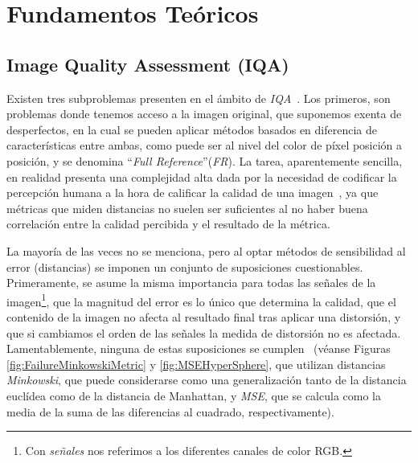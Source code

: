 \chapter{Fundamentos Teóricos}
\section{Image Quality Assessment (IQA)}
\label{sec:IQA}
Existen tres subproblemas presenten en el ámbito de \emph{IQA}~\cite{RecentIQASurvey, IQABook, VisualMedicalQualityBook}. Los primeros, son problemas 
donde tenemos acceso a la imagen original, que suponemos exenta de desperfectos, 
en la cual se pueden aplicar métodos basados en diferencia de características 
entre ambas, como puede ser al nivel del color de píxel posición a posición,
y se denomina ``\emph{Full Reference}''(\emph{FR}). 
La tarea, aparentemente sencilla, en realidad presenta una complejidad alta dada por 
la necesidad de codificar la percepción humana a la hora de calificar la calidad 
de una imagen~\cite{WhyIsIQASoDifficult}, ya que métricas que miden distancias no suelen 
ser suficientes al no haber buena correlación entre la calidad percibida y el 
resultado de la métrica.

La mayoría de las veces no se menciona, pero al optar métodos de sensibilidad 
al error (distancias) se imponen un conjunto de suposiciones cuestionables. 
Primeramente, se asume la misma importancia para todas las señales de la imagen\footnote{
  Con \emph{señales} nos referimos a los diferentes canales de color RGB.
}, que
la magnitud del error es lo único que determina la calidad, que el contenido de la imagen 
no afecta al resultado final tras aplicar una distorsión, y que si cambiamos el 
orden de las señales la medida de distorsión no es afectada.
Lamentablemente, ninguna de estas suposiciones se cumplen~\cite{Wang2006ModernIQ} (véanse Figuras \ref{fig:FailureMinkowskiMetric} y \ref{fig:MSEHyperSphere}, 
que utilizan distancias \emph{Minkowski}, 
que puede considerarse como una generalización tanto de 
la distancia euclídea como de la distancia de Manhattan, 
y \emph{MSE}, 
que se calcula como la media de la suma de las 
diferencias al cuadrado, respectivamente).


